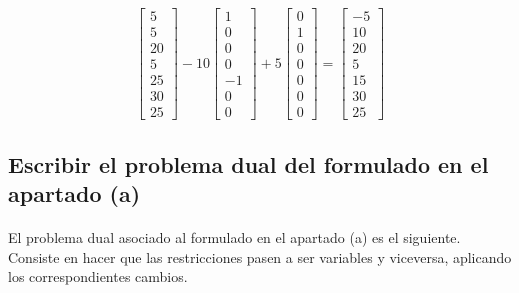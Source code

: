 \documentclass[10pt, a4paper]{article}
\begin{document}
			\[
			\begin{bmatrix}
				5 \\
				5 \\
				20 \\
				5 \\
				25 \\
				30 \\
				25
			\end{bmatrix}
			-10
			\begin{bmatrix}
				1 \\
				0 \\
				0 \\
				0 \\
				-1 \\
				0 \\
				0
			\end{bmatrix}
			+5
			\begin{bmatrix}
				0 \\
				1 \\
				0 \\
				0 \\
				0 \\
				0 \\
				0
			\end{bmatrix}
			=
			\begin{bmatrix}
				-5 \\
				10 \\
				20 \\
				5 \\
				15 \\
				30 \\
				25
			\end{bmatrix}
			\]

		\subsection{Escribir el problema dual del formulado en el apartado (a)}

			\paragraph{}
			El problema dual asociado al formulado en el apartado (a) es el siguiente. Consiste en hacer que las restricciones pasen a ser variables y viceversa, aplicando los correspondientes cambios.
				
\end{document}
